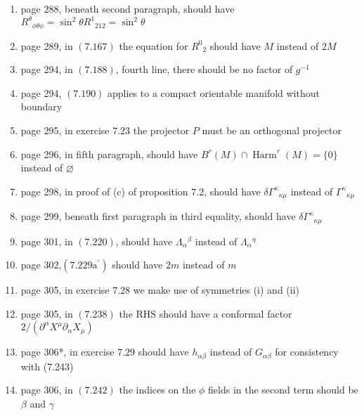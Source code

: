 \documentclass{article}
\begin{document}
\begin{enumerate}
\item page 288, beneath second paragraph, should have $R^{\theta}{}_{\phi \theta \phi}=\sin ^{2} \theta R^{1}{}_{212}=\sin ^{2} \theta$

\item page 289, in $(7.167)$ the equation for $R^{0}{}_{2}$ should have $M$ instead of $2 M$

\item page 294, in $(7.188)$, fourth line, there should be no factor of $g^{-1}$

\item page 294, $(7.190)$ applies to a compact orientable manifold without boundary

\item page 295, in exercise $7.23$ the projector $P$ must be an orthogonal projector

\item page 296, in fifth paragraph, should have $B^{r}(M) \cap \operatorname{Harm}^{r}(M)=\{0\}$ instead of $\varnothing$

\item page 298, in proof of (c) of proposition $7.2$, should have $\delta \Gamma^{\kappa}{}_{\kappa \mu}$ instead of $\Gamma^{\kappa}{}_{\kappa \mu}$

\item page 299, beneath first paragraph in third equality, should have $\delta \Gamma^{\kappa}{}_{\kappa \mu}$

\item page 301, in $(7.220)$, should have $\Lambda_{\alpha}{ }^{\beta}$ instead of $\Lambda_{\alpha}{ }^{\eta}$

\item page 302,$ \left(7.229 \mathrm{a}^{\prime}\right)$ should have $2 m$ instead of $m$

\item page 305, in exercise $7.28$ we make use of symmetries (i) and (ii)

\item page 305, in $(7.238)$ the $\mathrm{RHS}$ should have a conformal factor $2 /\left(\partial^{\alpha} X^{\mu} \partial_{\alpha} X_{\mu}\right)$

\item page 306*, in exercise $7.29$ should have $h_{\alpha \beta}$ instead of $G_{\alpha \beta}$ for consistency with (7.243)

\item page 306, in $(7.242)$ the indices on the $\phi$ fields in the second term should be $\beta$ and $\gamma$
\end{enumerate}
\end{document}
